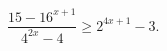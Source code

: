 \begin{ex}[type=inequality]
	\begin{condition}
		$\dfrac{15 - 16^{x + 1}}{4^{2x} - 4}\geqslant 2^{4x + 1} - 3 .$
	\end{condition}
\end{ex}